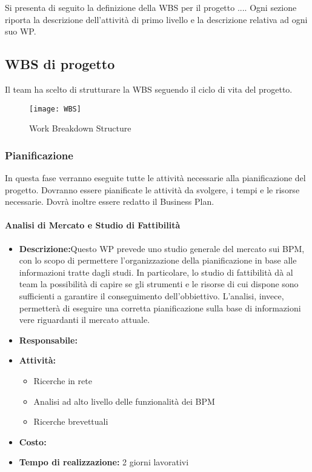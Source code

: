 Si presenta di seguito la definizione della WBS per il progetto ....%
Ogni sezione riporta la descrizione dell'attività di primo livello e la descrizione relativa ad ogni suo WP. 

\subsection{WBS di progetto}

Il team ha scelto di strutturare la WBS seguendo il ciclo di vita del progetto.
\begin{figure}[h!]
  \texttt{[image: WBS]}
	\caption{Work Breakdown Structure}
\end{figure}

\subsubsection{Pianificazione}
In questa fase verranno eseguite tutte le attività necessarie alla pianificazione del progetto.
Dovranno essere pianificate le attività da svolgere, i tempi e le risorse necessarie. Dovrà inoltre essere redatto il Business  Plan.
\paragraph{Analisi di Mercato e Studio di Fattibilità}



\begin{itemize}
\item{\bfseries Descrizione:}Questo WP prevede uno studio generale del mercato sui  BPM, con lo scopo di permettere l'organizzazione della pianificazione in base alle informazioni tratte dagli studi.
In particolare, lo studio di fattibilità dà al team la possibilità di capire se gli strumenti e le risorse di cui dispone sono sufficienti a garantire il conseguimento dell'obbiettivo.
L'analisi, invece, permetterà di eseguire una corretta pianificazione sulla base di informazioni vere riguardanti il mercato attuale. 
\item {\bfseries Responsabile:}
\item  {\bfseries Attività:}
	\begin{itemize}
		\item Ricerche in rete
		\item Analisi ad alto livello delle funzionalità dei  BPM
		\item Ricerche brevettuali
	\end{itemize}
\item  {\bfseries Costo:}
\item  {\bfseries Tempo di realizzazione: }2 giorni lavorativi
\end{itemize}



